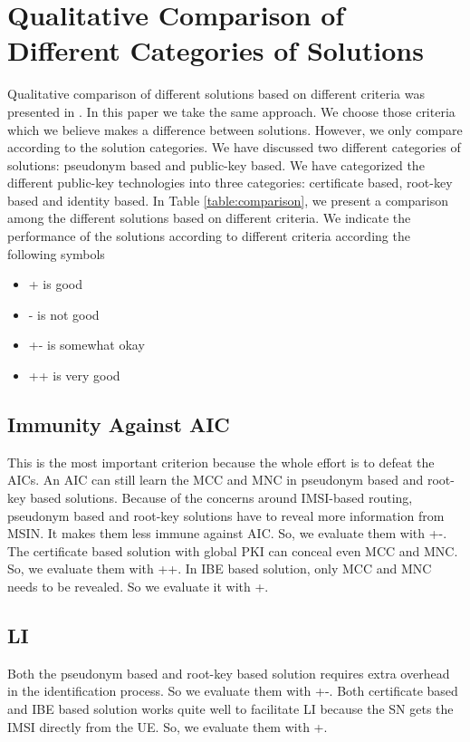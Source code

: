 \documentclass[conference]{IEEEtran}
\begin{document}
\section{Qualitative Comparison of Different Categories of Solutions}
Qualitative comparison of different solutions based on different criteria was presented in \cite{ICTJournal}. In this paper we take the same approach. We choose those criteria which we believe makes a difference between solutions. However, we only compare according to the solution categories.  We have discussed two different categories of solutions: pseudonym based and public-key based. We have categorized the different public-key technologies into three categories: certificate based, root-key based and identity based. In Table \ref{table:comparison}, we present a comparison among the different solutions based on different criteria. We indicate the performance of the solutions according to different criteria according the following symbols

\begin{itemize}
\item + is good 
\item - is not good
\item +- is somewhat okay
\item ++ is very good
\end{itemize}

\subsection{Immunity Against AIC} This is the most important criterion because the whole effort is to defeat the AICs. An AIC can still learn the MCC and MNC in pseudonym based and root-key based solutions. Because of the concerns around IMSI-based routing, pseudonym based and root-key solutions have to reveal more information from MSIN. It makes them less immune against AIC. So, we evaluate them with +-. The certificate based solution with global PKI can conceal even MCC and MNC. So, we evaluate them with ++. In IBE based solution, only MCC and MNC needs to be revealed. So we evaluate it with +.

\subsection{LI} Both the pseudonym based and root-key based solution requires extra overhead in the identification process. So we evaluate them with +-. Both certificate based and IBE based solution works quite well to facilitate LI because the SN gets the IMSI directly from the UE. So, we evaluate them with +.
\end{document}
